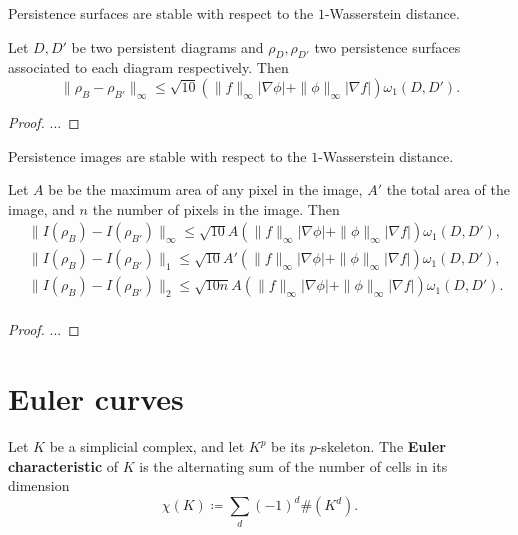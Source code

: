 Persistence surfaces are stable with respect to the $1$-Wasserstein distance.

\begin{theorem}
    Let $ D, D' $ be two persistent diagrams and $ \rho_D, \rho_{D'} $ two  persistence surfaces associated to each diagram respectively. Then
    \begin{equation}
        \| \rho_B - \rho_{B'} \|_\infty \leq \sqrt{10} (\|f\|_\infty |\nabla \phi | + \|\phi\|_\infty |\nabla f |) \omega_1(D, D').
    \end{equation}
\end{theorem}
\begin{proof}
    ...
\end{proof}

Persistence images are stable with respect to the $1$-Wasserstein distance.

\begin{theorem}
    Let $ A $ be be the maximum area of any pixel in the image, $ A' $ the total area of the image, and $ n $ the number of pixels in the image. Then
    \begin{align}
        &\| I(\rho_B) - I(\rho_{B'}) \|_\infty \leq \sqrt{10} A (\|f\|_\infty |\nabla \phi | + \|\phi\|_\infty |\nabla f |) \omega_1(D, D'), \\
        &\| I(\rho_B) - I(\rho_{B'}) \|_1 \leq \sqrt{10} A' (\|f\|_\infty |\nabla \phi | + \|\phi\|_\infty |\nabla f |) \omega_1(D, D'), \\
        &\| I(\rho_B) - I(\rho_{B'}) \|_2 \leq \sqrt{10n} A (\|f\|_\infty |\nabla \phi | + \|\phi\|_\infty |\nabla f |) \omega_1(D, D'). \\
    \end{align}
\end{theorem}
\begin{proof}
    ...
\end{proof}

\section{Euler curves}

\begin{definition}
    Let $ K $ be a simplicial complex, and let $ K^p $ be its $p$-skeleton. The {\bf Euler characteristic} of $ K $ is the alternating sum of the number of cells in its dimension
    \begin{equation}
        \chi(K) \coloneq \sum_d (-1)^d \#(K^d).
    \end{equation}
\end{definition}

